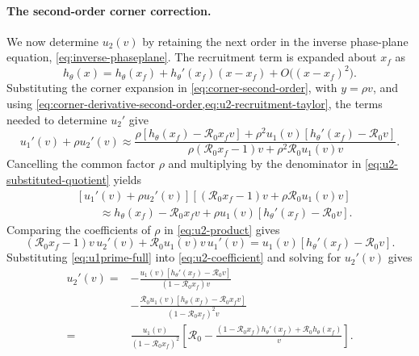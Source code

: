 \documentclass[11pt]{article}
\newcommand{\Rzero}{\mathcal R_0}
\newcommand{\rhoeps}{\rho}
\newcommand{\hth}{h_\theta}
\newcommand{\xf}{x_f}
\begin{document}
\paragraph{The second-order corner correction.}
We now determine \(u_2(v)\) by retaining the next order in the inverse phase-plane equation, \cref{eq:inverse-phaseplane}. The recruitment term is expanded about \(\xf\) as
\begin{equation}
\hth(x)=\hth(\xf)+\hth'(\xf)(x-\xf)+O\bigl((x-\xf)^2\bigr).
\label{eq:u2-recruitment-taylor}
\end{equation}
Substituting the corner expansion in \cref{eq:corner-second-order}, with \(y=\rhoeps v\), and using \cref{eq:corner-derivative-second-order,eq:u2-recruitment-taylor}, the terms needed to determine \(u_2'\) give
\begin{equation}
u_1'(v)+\rhoeps u_2'(v)
\approx
\frac{\rhoeps\left[\hth(\xf)-\Rzero\xf v\right]
+\rhoeps^2u_1(v)\left[\hth'(\xf)-\Rzero v\right]}
{\rhoeps(\Rzero\xf-1)v+\rhoeps^2\Rzero u_1(v)v}.
\label{eq:u2-substituted-quotient}
\end{equation}
Cancelling the common factor \(\rhoeps\) and multiplying by the denominator in \cref{eq:u2-substituted-quotient} yields
\begin{equation}
\begin{aligned}
&\left[u_1'(v)+\rhoeps u_2'(v)\right]
\left[(\Rzero\xf-1)v+\rhoeps\Rzero u_1(v)v\right]\\
&\qquad\approx\hth(\xf)-\Rzero\xf v
+\rhoeps u_1(v)\left[\hth'(\xf)-\Rzero v\right].
\end{aligned}
\label{eq:u2-product}
\end{equation}
Comparing the coefficients of \(\rhoeps\) in \cref{eq:u2-product} gives
\begin{equation}
(\Rzero\xf-1)v\,u_2'(v)+\Rzero u_1(v)v\,u_1'(v)
=u_1(v)\left[\hth'(\xf)-\Rzero v\right].
\label{eq:u2-coefficient}
\end{equation}
Substituting \cref{eq:u1prime-full} into \cref{eq:u2-coefficient} and solving for \(u_2'(v)\) gives
\begin{equation}
\begin{aligned}
u_2'(v)={}&-\frac{u_1(v)\left[\hth'(\xf)-\Rzero v\right]}{(1-\Rzero\xf)v}\\
&-\frac{\Rzero u_1(v)\left[\hth(\xf)-\Rzero\xf v\right]}{(1-\Rzero\xf)^2v}\\
={}&\frac{u_1(v)}{(1-\Rzero\xf)^2}
\left[\Rzero-\frac{(1-\Rzero\xf)\hth'(\xf)+\Rzero\hth(\xf)}{v}\right].
\end{aligned}
\label{eq:u2prime-full}
\end{equation}
\end{document}
